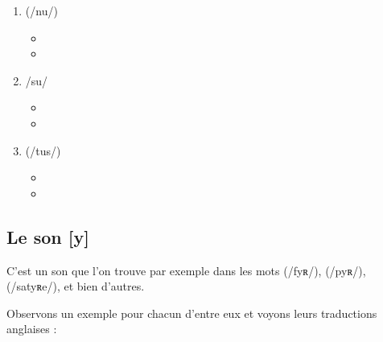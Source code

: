 \begin{enumerate}
\item {} (/nu/)
  \begin{itemize}
  \item {}
    \item {}
    \end{itemize}
    
\item {} /su/
  \begin{itemize}
  \item {}
  \item {}
  \end{itemize}

\item {} (/tus/)
  \begin{itemize}
  \item {}
  \item {}
  \end{itemize}
   
\end{enumerate}         
        
\subsection{Le son [y]}\label{subsec:yfr}

C'est un son que l'on trouve par exemple dans les mots
 (/fyʀ/),  (/pyʀ/),  (/satyʀe/), et bien d'autres.

Observons un exemple pour chacun d'entre eux et voyons leurs
traductions anglaises :\par

